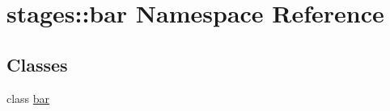 \hypertarget{namespacestages_1_1bar}{\section{stages\-:\-:bar \-Namespace \-Reference}
\label{namespacestages_1_1bar}
}
\subsection*{\-Classes}
\begin{DoxyCompactItemize}
\item 
class \hyperlink{classstages_1_1bar_1_1bar}{bar}
\end{DoxyCompactItemize}
